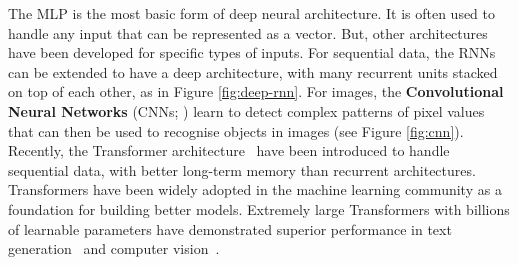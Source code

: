The MLP is the most basic form of deep neural architecture. It is often used to handle any input that can be represented as a vector. But, other architectures have been developed for specific types of inputs. For sequential data, the RNNs can be extended to have a deep architecture, with many recurrent units stacked on top of each other, as in Figure \ref{fig:deep-rnn}. For images, the \textbf{Convolutional Neural Networks} (CNNs; \cite{LeCun1989_CNN, Krizhevsky2012_AlexNet, Simonyan2015_VGG}) learn to detect complex patterns of pixel values that can then be used to recognise objects in images (see Figure \ref{fig:cnn}). Recently, the Transformer architecture~\citep{Vaswani2017_Transformer} have been introduced to handle sequential data, with better long-term memory than recurrent architectures. Transformers have been widely adopted in the machine learning community as a foundation for building better models. Extremely large Transformers with billions of learnable parameters have demonstrated superior performance in text generation~\citep{Ouyang2022_InstructGPT} and computer vision~\citep{Dosovitskiy2021_VisionTransformer}.

